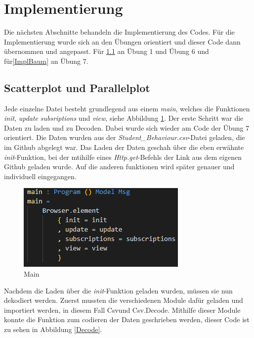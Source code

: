 \documentclass[usegeometry=true]{scrartcl}
\begin{document}
\section{Implementierung}

Die nächsten Abschnitte behandeln die Implementierung des Codes. Für die Implementierung wurde sich an den Übungen orientiert und dieser Code dann übernommen und angepasst. Für \ref{ScatterParallel} an Übung 1 und  Übung 6 und für\ref{ImplBaum} an Übung 7.\\

\subsection{Scatterplot und Parallelplot}
\label{ScatterParallel}

\noindent Jede einzelne Datei besteht grundlegend aus einem \textit{main}, welches die Funktionen \textit{init}, \textit{update} \textit{subsriptions} und \textit{view}, siehe Abbildung \ref{Main}.
Der erste Schritt war die Daten zu laden und zu Decoden. Dabei wurde sich wieder am Code der Übung 7 orientiert. Die Daten wurden aus der \textit{Student\_Behaviour.csv}-Datei geladen, die im Github abgelegt war. Das Laden der Daten geschah über die eben erwähnte \textit{init}-Funktion, bei der mtihilfe eines \textit{Http.get}-Befehls der Link aus dem eigenen Github geladen wurde. Auf die anderen funktionen wird später genauer und individuell eingegangen.





\begin{figure}[h]
\begin{center}
	\includegraphics[scale=.75]{Main.png}
	\caption{Main}
	\label{Main}
\end{center}
\end{figure}


\noindent Nachdem die Laden über die \textit{init}-Funktion geladen wurden, müssen sie nun dekodiert werden.
Zuerst mussten die verschiedenen Module dafür geladen und importiert werden, in diesem Fall \glqq Csv\grqq und \glqq Csv.Decode\grqq. %
Mithilfe dieser Module konnte die Funktion zum codieren der Daten geschrieben werden, dieser Code ist zu sehen in Abbildung \ref{Decode}.\\
\end{document}
